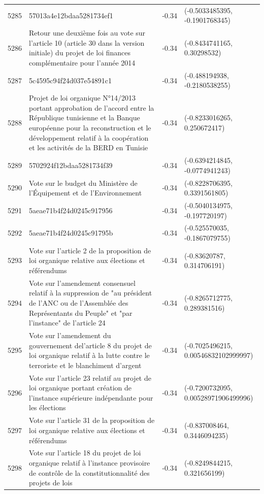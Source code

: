 \begin{table}[ht]
\begin{tabular}{rlrl}
  5285 & 57013a4e12bdaa5281734ef1 & -0.34 & (-0.5033485395, -0.1901768345) \\ 
  5286 & Retour une deuxième fois au vote sur l'article 10 (article 30 dans la version initiale) du projet de loi finances complémentaire pour l'année 2014 & -0.34 & (-0.8434741165, 0.30298532) \\ 
  5287 & 5c4595c94f24d037e54891c1 & -0.34 & (-0.488194938, -0.2180538255) \\ 
  5288 & Projet de loi organique N°14/2013 portant approbation de l'accord entre la République tunisienne et la Banque européenne pour la reconstruction et le développement relatif à la coopération et les activités de la BERD en Tunisie & -0.34 & (-0.8233016265, 0.250672417) \\ 
  5289 & 5702924f12bdaa5281734f39 & -0.34 & (-0.6394214845, -0.0774941243) \\ 
  5290 & Vote sur le budget du Ministère de l'Équipement et de l'Environnement & -0.34 & (-0.8228706395, 0.3391561805) \\ 
  5291 & 5aeae71b4f24d0245c917956 & -0.34 & (-0.5040134975, -0.197720197) \\ 
  5292 & 5aeae71b4f24d0245c91795b & -0.34 & (-0.525570035, -0.1867079755) \\ 
  5293 & Vote sur l'article 2 de la proposition de loi organique relative aux élections et référendums & -0.34 & (-0.83620787, 0.314706191) \\ 
  5294 & Vote sur l'amendement consensuel relatif à la suppression de "au président de l’ANC ou de l’Assemblée des Représentants du Peuple" et "par l'instance" de l'article 24 & -0.34 & (-0.8265712775, 0.289381516) \\ 
  5295 & Vote sur l'amendement du gouvernement del'article 8 du projet de loi organique relatif à la lutte contre le terroriste et le blanchiment d'argent & -0.34 & (-0.7025496215, 0.00546832102999997) \\ 
  5296 & Vote sur l'article 23 relatif au projet de loi organique portant création de l'instance supérieure indépendante pour les élections & -0.34 & (-0.7200732095, 0.00528971906499996) \\ 
  5297 & Vote sur l'article 31 de la proposition de loi organique relative aux élections et référendums & -0.34 & (-0.837008464, 0.3446094235) \\ 
  5298 & Vote sur l'article 18 du projet de loi organique relatif à l'instance provisoire de contrôle de la constitutionnalité des projets de lois & -0.34 & (-0.8249844215, 0.321656199) \\ 

\end{tabular}
\end{table}
